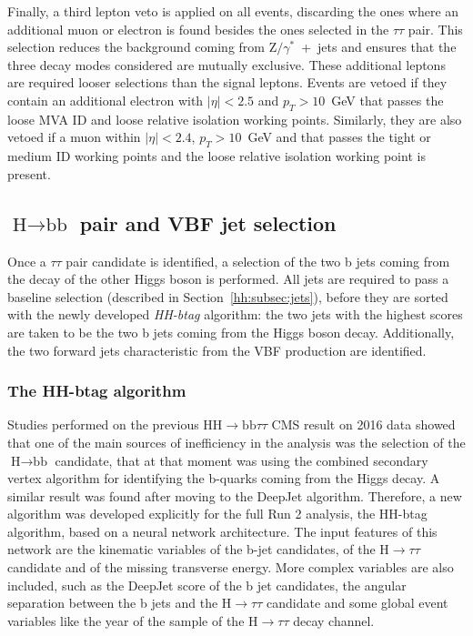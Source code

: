 \documentclass[../main.tex]{subfiles}
\begin{document}
Finally, a third lepton veto is applied on all events, discarding the ones where an additional muon or electron is found besides the ones selected in the $\tau\tau$ pair. This selection reduces the background coming from Z$/\gamma^*$~+~jets and ensures that the three \tauh\tauh{} decay modes considered are mutually exclusive. These additional leptons are required looser selections than the signal leptons. Events are vetoed if they contain an additional electron with $|\eta|<2.5$ and $p_T>10$~GeV that passes the loose MVA ID and loose relative isolation working points. Similarly, they are also vetoed if a muon within $|\eta| < 2.4$, $p_T > 10$~GeV and that passes the tight or medium ID working points and the loose relative isolation working point is present.


\subsection{$\text{H}\to\text{bb}$ pair and VBF jet selection}
\label{hh:sec:hbb}

Once a $\tau\tau$ pair candidate is identified, a selection of the two b jets coming from the decay of the other Higgs boson is performed. All jets are required to pass a baseline selection (described in Section~\ref{hh:subsec:jets}), before they are sorted with the newly developed \textit{HH-btag} algorithm: the two jets with the highest scores are taken to be the two b jets coming from the Higgs boson decay. Additionally, the two forward jets characteristic from the VBF production are identified. 

\subsubsection{The HH-btag algorithm}

Studies performed on the previous $\text{HH}\to\text{bb}\tau\tau$ CMS result on 2016 data \cite{hh:analysis:2016} showed that one of the main sources of inefficiency in the analysis was the selection of the $\text{H}\to\text{bb}$ candidate, that at that moment was using the combined secondary vertex \cite{hh:analysis:sv} algorithm for identifying the b-quarks coming from the Higgs decay. A similar result was found after moving to the DeepJet algorithm. Therefore, a new algorithm was developed explicitly for the full Run 2 analysis, the HH-btag algorithm, based on a neural network architecture. The input features of this network are the kinematic variables of the b-jet candidates, of the $\text{H}\to\tau\tau$ candidate and of the missing transverse energy. More complex variables are also included, such as the DeepJet score of the b jet candidates, the angular separation between the b jets and the $\text{H}\to\tau\tau$ candidate and some global event variables like the year of the sample of the $\text{H}\to\tau\tau$ decay channel.
\end{document}
